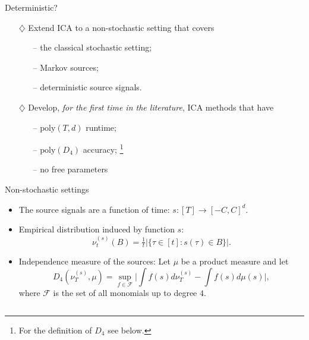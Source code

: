 \documentclass[final]{beamer} %
\begin{document}
\begin{frame}[c]
\begin{columns}[t,totalwidth=\textwidth]
\begin{column}{.24\textwidth}
\begin{block}{Deterministic?}
			\vspace{1cm}
			\begin{tcolorbox}[title = \vspace{0.4cm}\textbf{\large Our Contributions} \vspace{0.4cm}, title filled, width = 0.9\textwidth, colback = uofagreen!10, colframe = red]
			\begin{itemize}
			\vspace{0.5cm}
			\item[$\diamondsuit$] Extend ICA to a non-stochastic setting that covers
			\begin{itemize}
			\item[--] the classical stochastic setting;
			\item[--] Markov sources;
			\item[--] deterministic source signals.
			\end{itemize} 
			\vspace{1cm}
			\item[$\diamondsuit$] Develop, \emph{for the first time in the literature}, ICA methods that have
				\begin{itemize}
					\item[--] $\mathrm{poly}(T,d)$ runtime;
					\item[--] $\mathrm{poly}(D_4)$ accuracy;%
					\footnote{For the definition of $D_4$ see below.}
					\item[--] no free parameters
				\end{itemize}
			\end{itemize}		
			\end{tcolorbox}
		\end{block}
		\vspace{0.5ex}
		\begin{block}{Non-stochastic settings}
			\begin{itemize}
				\item The source signals are a function of time: $s:[T] \to [-C,C]^d$.
				\item Empirical distribution induced by function $s$:
				\[
					\nu_t^{(s)}(B)=\tfrac{1}{t}|\{\tau \in [t]: s(\tau) \in B\}|.
				\]
				\item Independence measure of the sources:
				Let $\mu$ be a product measure and let
				\[
				D_4(\nu_T^{(s)},\mu) = \sup_{f\in\mathcal{F}} \Big|\int f(s)d\nu_T^{(s)} - \int f(s)d\mu(s)\Big|,
				\]
				where $\mathcal{F}$ is the set of all monomials up to degree $4$.
			\end{itemize}
		\end{block}

\end{column}
\end{columns}
\end{frame}
\end{document}
